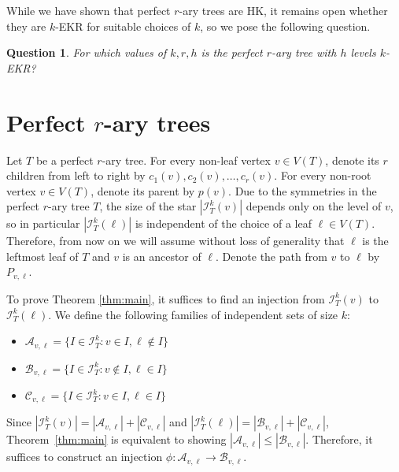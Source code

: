 \documentclass[11pt]{article}
\newtheorem{question}[theorem]{Question}
\theoremstyle{definition}
\newcommand{\cI}{\mathcal{I}}
\begin{document}
While we have shown that perfect $r$-ary trees are HK, it remains open whether they are $k$-EKR for suitable choices of $k$, so we pose the following question.
\begin{question}
For which values of $k,r,h$ is the perfect $r$-ary tree with $h$ levels $k$-EKR?
\end{question}
 
\section{Perfect $r$-ary trees}\label{sec:main}
Let $T$ be a perfect $r$-ary tree. For every non-leaf vertex $v\in V(T)$, denote its $r$ children from left to right by $c_1(v),c_2(v),\ldots,c_r(v)$.  For every non-root vertex $v\in V(T)$, denote its parent by $p(v)$. Due to the symmetries in the perfect $r$-ary tree $T$, the size of the star $|\mathcal{I}_{T}^{k}(v)|$ depends only on the level of $v$, so in particular $|\mathcal{I}_{T}^{k}(\ell)|$ is independent of the choice of a leaf $\ell\in V(T)$. Therefore, from now on we will assume without loss of generality that $\ell$ is the leftmost leaf of $T$ and $v$ is an ancestor of $\ell$. Denote the path from $v$ to $\ell$ by $P_{v,\ell}$.

To prove Theorem \ref{thm:main}, it suffices to find an injection from $\cI_{T}^k(v)$ to $\cI_T^k(\ell)$. We define the following families of independent sets of size $k$:
\begin{itemize}
  \item $\mathcal{A}_{v,\ell} = \{I \in \cI^k_T : v \in I,\ell\notin I\}$
  \item $\mathcal{B}_{v,\ell} = \{I \in \cI^k_T : v \notin I,\ell \in I\}$
  \item $\mathcal{C}_{v,\ell} = \{I \in \cI^k_T : v \in I,\ell \in I\}$
\end{itemize}
Since $|\mathcal{I}_{T}^{k}(v)| = |\mathcal{A}_{v,\ell}| + |\mathcal{C}_{v,\ell}|$ and $|\mathcal{I}_{T}^{k}(\ell)| = |\mathcal{B}_{v,\ell}| + |\mathcal{C}_{v,\ell}|$, Theorem~\ref{thm:main} is equivalent to showing $|\mathcal{A}_{v,\ell}| \leq |\mathcal{B}_{v,\ell}|$. Therefore, it suffices to construct an injection $\phi: \mathcal{A}_{v,\ell} \to \mathcal{B}_{v,\ell}$. 
\end{document}
